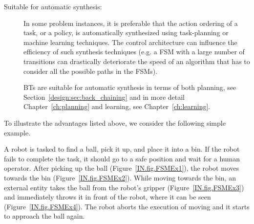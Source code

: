 \begin{description}
\item[Suitable for automatic synthesis:] In some problem instances, it is preferable that the action ordering of a task, or a policy, is automatically synthesized using task-planning or machine learning techniques. The  control architecture  can influence the efficiency of such synthesis techniques (e.g. a FSM with a large number of transitions can drastically deteriorate the speed of an algorithm that has to consider all the possible paths in the FSMs).

BTs are suitable for automatic synthesis in terms of both planning, see Section~\ref{design:sec:back_chaining} and in more detail Chapter~\ref{ch:planning} and learning, see Chapter~\ref{ch:learning}.

\end{description}






To  illustrate the advantages listed above, we consider the following simple example. %

\begin{example}
\label{Introduction.ex.motivating}
A robot is tasked to find a ball, pick it up, and place it into a bin. If the robot fails to complete the task, it should go to a safe position and wait for a human operator. After picking up the ball (Figure~\ref{IN.fig.FSMEx1}), the robot moves towards the bin (Figure~\ref{IN.fig.FSMEx2}). While moving towards the bin, an external entity takes the ball from the robot's gripper (Figure~\ref{IN.fig.FSMEx3}) and immediately throws it in front of the robot, where it can be seen (Figure~\ref{IN.fig.FSMEx4}). The robot aborts the execution of moving and it starts to approach the ball again.  
\end{example}





